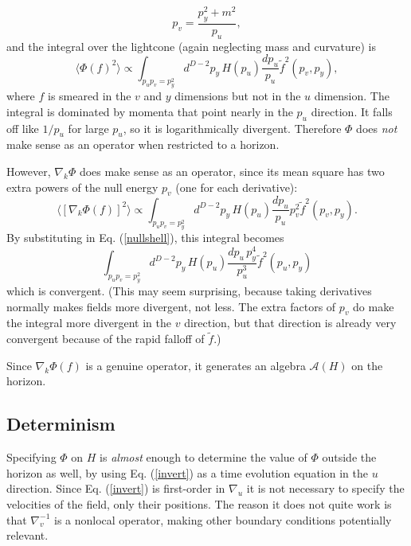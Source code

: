 \documentclass[12pt]{article}
\begin{document}
\begin{equation}\label{nullshell}
p_v = \frac{p_y^2 + m^2}{p_u},
\end{equation}
and the integral over the lightcone (again neglecting mass and curvature) is
\begin{equation}\label{spectral}
\langle \Phi(f)^2 \rangle \propto
\int_{p_u p_v = p_y^2} d^{D-2}p_y\,H(p_u) \frac{dp_u}{p_u} \tilde{f}^2(p_v, p_y),
\end{equation}
where $f$ is smeared in the $v$ and $y$ dimensions but not in the $u$ dimension.  The integral is dominated by momenta that point nearly in the $p_u$ direction.  It falls off like $1/p_u$ for large $p_u$, so it is logarithmically divergent.  Therefore $\Phi$ does \emph{not} make sense as an operator when restricted to a horizon.

However, $\nabla_k \Phi$ does make sense as an operator, since its mean square has two extra powers of the null energy $p_v$ (one for each derivative):
\begin{equation}
\langle [\nabla_k \Phi(f)]^2 \rangle \propto
\int_{p_u p_v = p_y^2} d^{D-2}p_y\,H(p_u)\frac{dp_u}{p_u} p_v^2 \tilde{f}^2(p_v, p_y).
\end{equation}
By substituting in Eq. (\ref{nullshell}), this integral becomes
\begin{equation}
\int_{p_u p_v = p_y^2} d^{D-2}p_y\,H(p_u)\frac{dp_u\,p_y^4}{p_u^3} \tilde{f}^2(p_u, p_y)
\end{equation}
which is convergent.  (This may seem surprising, because taking derivatives normally makes fields more divergent, not less.  The extra factors of $p_v$ do make the integral more divergent in the $v$ direction, but that direction is already very convergent because of the rapid falloff of $\tilde{f}$.)

Since $\nabla_k \Phi(f)$ is a genuine operator, it generates an algebra $\mathcal{A}(H)$ on the horizon.

\subsection{Determinism}

Specifying $\Phi$ on $H$ is \emph{almost} enough to determine the value of $\Phi$ outside the horizon as well, by using Eq. (\ref{invert}) as a time evolution equation in the $u$ direction.  Since Eq. (\ref{invert}) is first-order in $\nabla_u$ it is not necessary to specify the velocities of the field, only their positions.  The reason it does not quite work is that $\nabla_v^{-1}$ is a nonlocal operator, making other boundary conditions potentially relevant.
\end{document}
